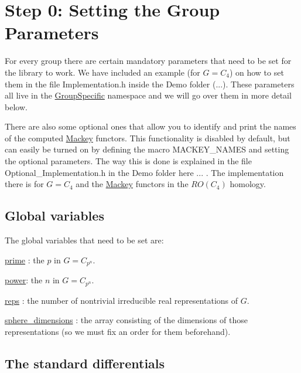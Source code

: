 \hypertarget{use_how}{}\section{Step 0\+: Setting the Group Parameters}\label{use_how}

\begin{DoxyItemize}
\item For every group there are certain mandatory parameters that need to be set for the library to work. We have included an example (for $G=C_4$) on how to set them in the file Implementation.\+h inside the Demo folder (...). These parameters all live in the \hyperlink{namespaceGroupSpecific}{Group\+Specific} namespace and we will go over them in more detail below.
\item There are also some optional ones that allow you to identify and print the names of the computed \hyperlink{namespaceMackey}{Mackey} functors. This functionality is disabled by default, but can easily be turned on by defining the macro {\ttfamily M\+A\+C\+K\+E\+Y\+\_\+\+N\+A\+M\+ES} and setting the optional parameters. The way this is done is explained in the file Optional\+\_\+\+Implementation.\+h in the Demo folder here ... . The implementation there is for $G=C_4$ and the \hyperlink{namespaceMackey}{Mackey} functors in the $RO(C_4)$ homology.
\end{DoxyItemize}\hypertarget{use_var}{}\subsection{Global variables}\label{use_var}
The global variables that need to be set are\+:


\begin{DoxyItemize}
\item \hyperlink{classGroupSpecific_1_1Variables_a38586ec998bcbfdf325e6cfc6598b54b}{prime} \+: the $p$ in $G=C_{p^n}$.
\item \hyperlink{classGroupSpecific_1_1Variables_ac9bd6be19cc41e6877ee25a2d1c7be80}{power}\+: the $n$ in $G=C_{p^n}$.
\item \hyperlink{classGroupSpecific_1_1Variables_a5504789b0b60050e6ea223fdeb84874a}{reps} \+: the number of nontrivial irreducible real representations of $G$.
\item \hyperlink{classGroupSpecific_1_1Variables_a4746f16736abcf4c705dd8690ec12ca0}{sphere\+\_\+dimensions} \+: the array consisting of the dimensions of those representations (so we must fix an order for them beforehand).
\end{DoxyItemize}\hypertarget{use_fun}{}\subsection{The standard differentials}\label{use_fun}

